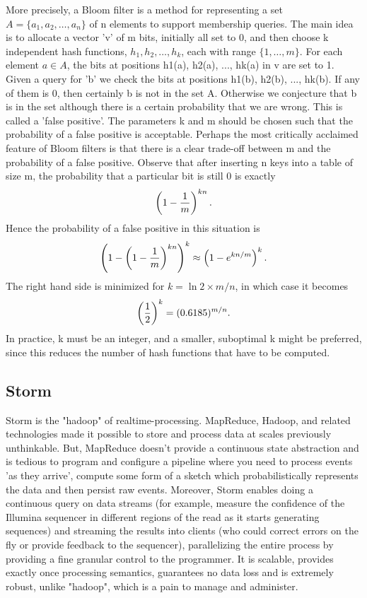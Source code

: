 \documentclass[11pt]{article}
\begin{document}
More precisely, a Bloom filter is a method for representing a set $A = \{a_1, a_2, \ldots, a_n\}$ of n elements to support membership queries. The main idea is to allocate a vector 'v' of m bits, initially all set to 0, and then choose k independent hash functions, $h_1, h_2, \ldots, h_k$, each with range $\{1,\ldots,m\}$. For each element $a \in A$, the bits at positions h1(a), h2(a), ..., hk(a) in v are set to 1. Given a query for 'b' we check the bits at positions h1(b), h2(b), ..., hk(b). If any of them is 0, then certainly b is not in the set A. Otherwise we conjecture that b is in the set although there is a certain probability that we are wrong. This is called a 'false positive'. The parameters k and m should be chosen such that the probability of a false positive is acceptable. Perhaps the most critically acclaimed  feature of Bloom filters is that there is a clear trade-off between m and the probability of a false positive. Observe that after inserting n keys into a table of size m, the probability that a particular bit is still 0 is exactly
\begin{displaymath} \left(1 - {1\over m}\right)^{k n}.\end{displaymath}
Hence the probability of a false positive in this situation is
\begin{displaymath} \left( 1 - \left(1 - {1\over m}\right)^{k n} \right)^k \approx \left(1 - e ^ { k n /m} \right)^k .\end{displaymath}
The right hand side is minimized for $k = \ln 2 \times m / n$, in which case it becomes
\begin{displaymath} \left({1\over2} \right) ^k = (0.6185)^{m/n}.\end{displaymath}
In practice, k must be an integer, and a smaller, suboptimal k might be preferred, since this reduces the number of hash functions that have to be computed.

\subsection{Storm}
Storm \cite{storm} is the "hadoop" of realtime-processing. MapReduce, Hadoop, and related technologies made it possible to store and process data at scales previously unthinkable. But, MapReduce doesn't provide a continuous state abstraction and is tedious to program and configure a pipeline where you need to process events 'as they arrive', compute some form of a sketch \cite{bloom} which probabilistically represents the data and then persist raw events. Moreover, Storm enables doing a continuous query on data streams (for example, measure the confidence of the Illumina sequencer in different regions of the read as it starts generating sequences) and streaming the results into clients (who could correct errors on the fly or provide feedback to the sequencer), parallelizing the entire process by providing a fine granular control to the programmer. It is scalable, provides exactly once processing semantics, guarantees no data loss and is extremely robust, unlike "hadoop", which is a pain to manage and administer.
\end{document}
